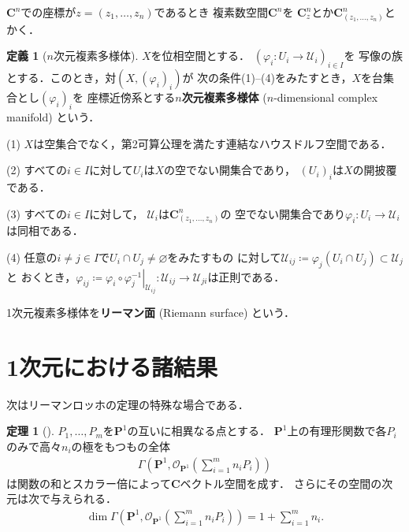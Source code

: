 \documentclass[11pt, a4paper, dvipdfmx, draft]{jsarticle}
\theoremstyle{definition}
\newtheorem{Definition}[Axiom]{定義}
\newtheorem{Theorem}[Axiom]{定理}
\newcommand{\cc}{\mathbf{C}}
\newcommand{\pp}{\mathbf{P}}
\newcommand{\mcal}{\mathcal}
\newcommand{\pphi}{\varphi} %
\newcommand{\UU}{\mcal{U}}
\newcommand{\OO}{\mcal{O}}
\newcommand{\emp}{\varnothing}
\newcommand{\ceq}{\coloneqq}
\newcommand{\sbs}{\subset}
\newcommand{\mapres}[2]{\left. #1 \right|_{#2}}
\theoremstyle{mystyle}
\begin{document}


$\cc^{n}$での座標が$z=(z_{1},\dots,z_{n})$であるとき
複素数空間$\cc^{n}$を
$\cc^{n}_{z}$とか$\cc^{n}_{(z_{1},\dots,z_{n})}$とかく．

\begin{Definition}[$n$次元複素多様体]
    $X$を位相空間とする．
    $(\pphi_{i}\colon U_{i}\to \UU_{i})_{i\in I}$を
    写像の族とする．このとき，対$(X,(\pphi_{i})_{i})$が
    次の条件(1)--(4)をみたすとき，$X$を台集合とし$(\pphi_{i})_i$を
    座標近傍系とする\textbf{$n$次元複素多様体} ($n$-dimensional complex manifold) という．

    (1) 
    $X$は空集合でなく，第2可算公理を満たす連結なハウスドルフ空間である．

    (2) 
    すべての$i\in I$に対して$U_i$は$X$の空でない開集合であり，
    $(U_i)_i$は$X$の開披覆である．

    (3) 
    すべての$i\in I$に対して，
    $\UU_i$は$\cc^{n}_{(z_{1},\dots,z_{n})}$の
    空でない開集合であり$\pphi_{i}\colon U_i\to\UU_i$は同相である．

    (4) 
    任意の$i\neq j \in I$で$U_i\cap U_j \neq \emp$をみたすもの
    に対して$\UU_{ij}\ceq \pphi_j(U_i\cap U_j)\sbs \UU_j$と
    おくとき，$\pphi_{ij}\ceq 
    \mapres{\pphi_{i}\circ\pphi_{j}^{-1}}{\UU_{ij}}
    \colon 
    \UU_{ij}\to\UU_{ji}$は正則である．
\end{Definition}

1次元複素多様体を\textbf{リーマン面} (Riemann surface) という．

\section{1次元における諸結果}


次はリーマンロッホの定理の特殊な場合である．

\begin{Theorem}[{\cite[命題1.14]{ogs}}]
    $P_{1},\dots,P_{m}$を$\pp^{1}$の互いに相異なる点とする．
    $\pp^{1}$上の有理形関数で各$P_i$のみで高々$n_i$の極をもつもの全体
    \begin{align*}
        \Gamma\left(\pp^{1}, \OO_{\pp^{1}}\left(\sum_{i=1}^{m}n_{i}P_{i}\right)\right)
    \end{align*}
    は関数の和とスカラー倍によって$\cc$ベクトル空間を成す．
    さらにその空間の次元は次で与えられる．
    \begin{align*}
        \dim\Gamma\left(
            \pp^{1}, \OO_{\pp^{1}}\left(
                \sum_{i=1}^{m}n_{i}P_{i}
                \right)
            \right)
        = 1+\sum_{i=1}^{m}n_{i}.
    \end{align*}
\end{Theorem}
\end{document}
